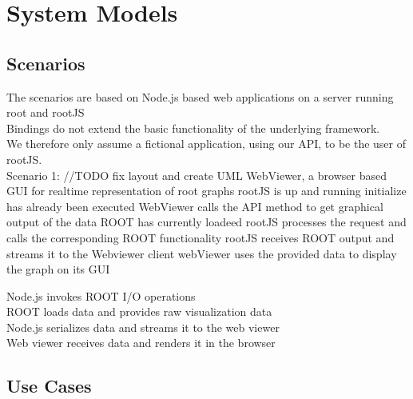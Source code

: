 \chapter{System Models}

\section{Scenarios}
The scenarios are based on Node.js based web applications on a server running root and rootJS\\
Bindings do not extend the basic functionality of the underlying framework.\\
We therefore only assume a fictional application, using our API, to be the user of rootJS.\\


Scenario 1: //TODO fix layout and create UML
WebViewer, a browser based GUI for realtime representation of root graphs
	rootJS is up and running initialize has already been executed
	WebViewer calls the API method to get graphical output of the data ROOT has currently loadeed
	\indent rootJS processes the request and calls the corresponding ROOT functionality
	\indent rootJS receives ROOT output and streams it to the Webviewer client
webViewer uses the provided data to display the graph on its GUI

\indent	Node.js invokes ROOT I/O operations\\
\indent \indent		ROOT loads data and provides raw visualization data\\
\indent	Node.js serializes data and streams it to the web viewer\\
Web viewer receives data and renders it in the browser\\
\section{Use Cases}

\pagebreak[4]

